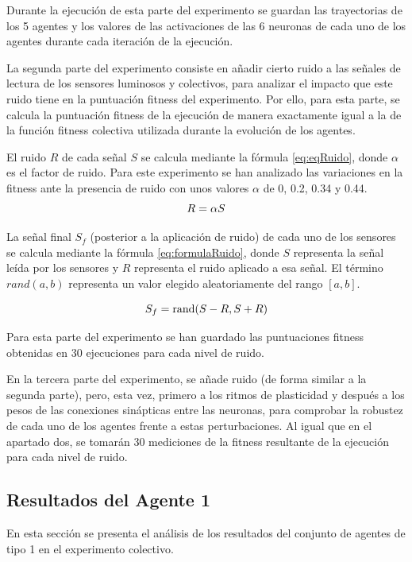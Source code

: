 Durante la ejecución de esta parte del experimento se guardan las trayectorias de los 5 agentes y los valores de las activaciones de las 6 neuronas de cada uno de los agentes durante cada iteración de la ejecución.

La segunda parte del experimento consiste en añadir cierto ruido a las señales de lectura de los sensores luminosos y colectivos, para analizar el impacto que este ruido tiene en la puntuación fitness del experimento. Por ello, para esta parte, se calcula la puntuación fitness de la ejecución de manera exactamente igual a la de la función fitness colectiva
utilizada durante la evolución de los agentes.

El ruido $R$ de cada señal $S$ se calcula mediante la fórmula \ref{eq:eqRuido}, donde $\alpha$ es el factor de ruido. Para este experimento se han analizado las variaciones en la fitness ante la presencia de ruido con unos valores $\alpha$ de 0, 0.2, 0.34 y 0.44.
\begin{equation} \label{eq:eqRuido}
 \centering
R = \alpha S
\end{equation}

La señal final $S_{f}$ (posterior a la aplicación de ruido) de cada uno de los sensores se calcula mediante la fórmula \ref{eq:formulaRuido}, donde $S$ representa la señal leída por los sensores y $R$ representa el ruido aplicado a esa señal. El término $rand(a,b)$ representa un valor elegido aleatoriamente del rango $[a,b]$.

\begin{equation} \label{eq:formulaRuido}
 \centering
S_{f} = \text{rand}(S - R, S + R)
\end{equation}

Para esta parte del experimento se han guardado las puntuaciones fitness obtenidas en 30 ejecuciones para cada nivel de ruido.

En la tercera parte del experimento, se añade ruido (de forma similar a la segunda parte), pero, esta vez, primero a los ritmos de plasticidad y después a los pesos de las conexiones sinápticas entre las neuronas, para comprobar la robustez de cada uno de los agentes frente a estas perturbaciones. Al igual que en el apartado dos, se tomarán 30 mediciones de la fitness resultante de la ejecución
para cada nivel de ruido.

\subsection{Resultados del Agente 1}
En esta sección se presenta el análisis de los resultados del conjunto de agentes de tipo 1 en el experimento colectivo.
